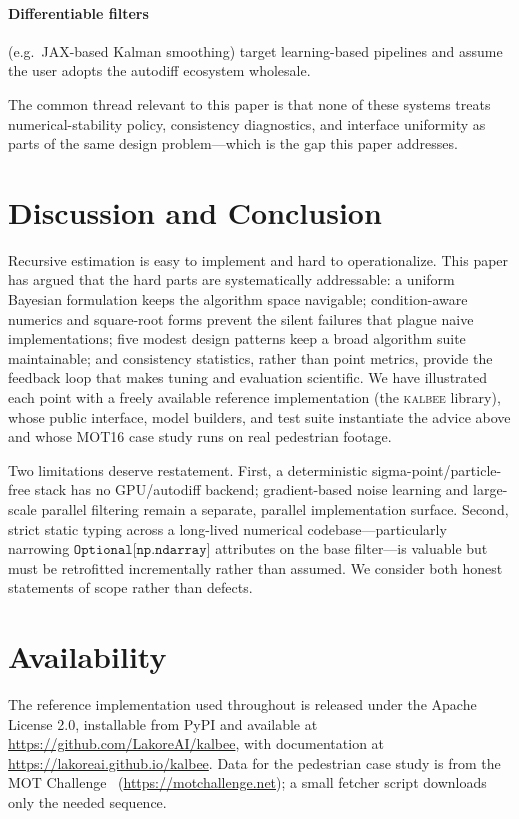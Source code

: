 \documentclass[10pt,conference]{IEEEtran}
\newcommand{\toolkit}{\textsc{kalbee}}
\begin{document}
\paragraph{Differentiable filters} (e.g.\ JAX-based Kalman smoothing) target
learning-based pipelines and assume the user adopts the autodiff ecosystem
wholesale.

The common thread relevant to this paper is that none of these systems treats
numerical-stability policy, consistency diagnostics, and interface uniformity
as parts of the same design problem---which is the gap this paper addresses.

\section{Discussion and Conclusion}

Recursive estimation is easy to implement and hard to operationalize. This
paper has argued that the hard parts are systematically addressable: a uniform
Bayesian formulation keeps the algorithm space navigable; condition-aware
numerics and square-root forms prevent the silent failures that plague naive
implementations; five modest design patterns keep a broad algorithm suite
maintainable; and consistency statistics, rather than point metrics, provide
the feedback loop that makes tuning and evaluation scientific. We have
illustrated each point with a freely available reference implementation
(the \toolkit{} library), whose public interface, model builders, and test
suite instantiate the advice above and whose MOT16 case study runs on real
pedestrian footage.

Two limitations deserve restatement. First, a deterministic
sigma-point/particle-free stack has no GPU/autodiff backend; gradient-based
noise learning and large-scale parallel filtering remain a separate,
parallel implementation surface. Second, strict static typing across a
long-lived numerical codebase---particularly narrowing
$\texttt{Optional[np.ndarray]}$ attributes on the base filter---is valuable
but must be retrofitted incrementally rather than assumed. We consider both
honest statements of scope rather than defects.

\section*{Availability}
The reference implementation used throughout is released under the Apache
License 2.0, installable from PyPI and available at
\url{https://github.com/LakoreAI/kalbee}, with documentation at
\url{https://lakoreai.github.io/kalbee}. Data for the pedestrian case study is
from the MOT Challenge~\cite{mot16} (\url{https://motchallenge.net}); a small
fetcher script downloads only the needed sequence.
\end{document}

